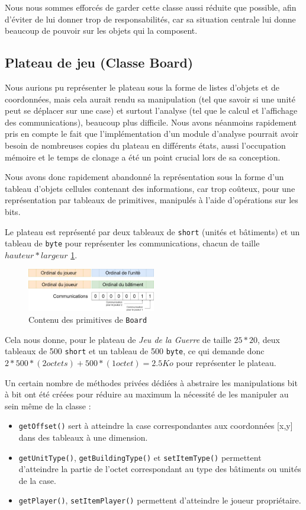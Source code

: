 \documentclass[a4paper]{report}
\begin{document}
Nous nous sommes efforcés de garder cette classe aussi réduite que possible, afin d'éviter de lui donner trop de responsabilités, car sa situation centrale lui donne beaucoup de pouvoir sur les objets qui la composent. 

\subsection{Plateau de jeu (Classe Board)}

Nous aurions pu représenter le plateau sous la forme de listes d'objets et de coordonnées, mais cela aurait rendu sa manipulation (tel que savoir si une unité peut se déplacer sur une case) et surtout l'analyse (tel que le calcul et l'affichage des communications), beaucoup plus difficile. Nous avons néanmoins rapidement pris en compte le fait que l'implémentation d'un module d'analyse pourrait avoir besoin de nombreuses copies du plateau en différents états, aussi l'occupation mémoire et le temps de clonage a été un point crucial lors de sa conception.

Nous avons donc rapidement abandonné la représentation sous la forme d'un tableau d'objets cellules contenant des informations, car trop coûteux, pour une représentation par tableaux de primitives, manipulés à l'aide d'opérations sur les bits.

Le plateau est représenté par deux tableaux de \texttt{short} (unités et bâtiments) et un tableau de \texttt{byte} pour représenter les communications, chacun de taille $hauteur*largeur$ \ref{fig:board_bits}.

\begin{figure}[h]
\centering
\includegraphics[width=0.5\textwidth]{implementation_game/pdp_board_bits}
\caption{Contenu des primitives de \texttt{Board}}
\label{fig:board_bits}
\end{figure}

Cela nous donne, pour le plateau de \textit{Jeu de la Guerre} de taille $25*20$, deux tableaux de 500 \texttt{short} et un tableau de 500 \texttt{byte}, ce qui demande donc $2*500*(2 octets) + 500*(1 octet) = 2.5Ko$ pour représenter le plateau.

Un certain nombre de méthodes privées dédiées à abstraire les manipulations bit à bit ont été créées pour réduire au maximum la nécessité de les manipuler au sein même de la classe :
\begin{itemize}
\item \texttt{getOffset()} sert à atteindre la case correspondantes aux coordonnées [x,y] dans des tableaux à une dimension.
\item \texttt{getUnitType()}, \texttt{getBuildingType()} et \texttt{setItemType()} permettent d'atteindre la partie de l'octet correspondant au type des bâtiments ou unités de la case.
\item \texttt{getPlayer()}, \texttt{setItemPlayer()} permettent d'atteindre le joueur propriétaire.
\end{itemize}
\end{document}
